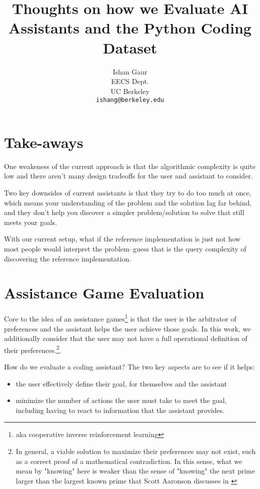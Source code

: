 \documentclass{article}
\title{Thoughts on how we Evaluate AI Assistants and the Python Coding Dataset}
\author{
  Ishan Gaur \\
  EECS Dept.\\
  UC Berkeley\\
  \texttt{ishang@berkeley.edu} \\
}
\begin{document}
\maketitle

\section{Take-aways}
One weakeness of the current approach is that the algorithmic complexity is quite low and there aren't many design tradeoffs for the user and assistant to consider.

Two key downsides of current assistants is that they try to do too much at once, which means your understanding of the problem and the solution lag far behind, and they don't help you discover a simpler problem/solution to solve that still meets your goals.

With our current setup, what if the reference implementation is just not how most people would interpret the problem--guess that is the query complexity of discovering the reference implementation.

\section{Assistance Game Evaluation}
Core to the idea of an assistance games\footnote{aka cooperative inverse reinforcement learning} is that the user is the arbitrator of preferences and the assistant helps the user achieve those goals. In this work, we additionally consider that the user may not have a full operational definition of their preferences.\footnote{In general, a viable solution to maximize their preferences may not exist, such as a correct proof of a mathematical contradiction. In this sense, what we mean by "knowing" here is weaker than the sense of "knowing" the next prime larger than the largest known prime that Scott Aaronson discusses in \cite{aaronson201310}}.

How do we evaluate a coding assistant? The two key aspects are to see if it helps:
\begin{itemize}
    \item the user effectively define their goal, for themselves and the assistant
    \item minimize the number of actions the user must take to meet the goal, including having to react to information that the assistant provides.
\end{itemize}
\end{document}

